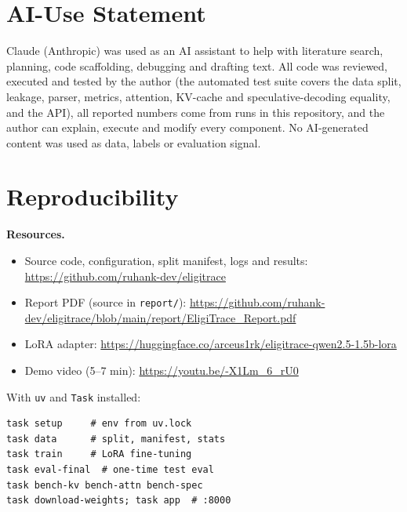 \section{AI-Use Statement}\label{app:ai}
Claude (Anthropic) was used as an AI assistant to help with literature search, planning, code scaffolding,
debugging and drafting text. All code was reviewed, executed and tested by the author (the automated test
suite covers the data split, leakage, parser, metrics, attention, KV-cache and speculative-decoding equality,
and the API), all reported numbers come from runs in this repository, and the author can explain, execute and
modify every component. No AI-generated content was used as data, labels or evaluation signal.

\section{Reproducibility}\label{app:repro}
\textbf{Resources.}
{\footnotesize\begin{itemize}\setlength{\itemsep}{0pt}
\item Source code, configuration, split manifest, logs and results: \url{https://github.com/ruhank-dev/eligitrace}
\item Report PDF (source in \texttt{report/}): \url{https://github.com/ruhank-dev/eligitrace/blob/main/report/EligiTrace_Report.pdf}
\item LoRA adapter: \url{https://huggingface.co/arceus1rk/eligitrace-qwen2.5-1.5b-lora}
\item Demo video (5--7 min): \url{https://youtu.be/-X1Lm_6_rU0}
\end{itemize}}
With \texttt{uv} and \texttt{Task} installed:
{\footnotesize
\begin{verbatim}
task setup     # env from uv.lock
task data      # split, manifest, stats
task train     # LoRA fine-tuning
task eval-final  # one-time test eval
task bench-kv bench-attn bench-spec
task download-weights; task app  # :8000
\end{verbatim}
}
